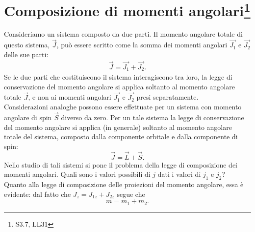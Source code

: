 \documentclass[a4paper,12pt,oneside]{book}
\newcommand*{\myfont}{\fontfamily{ppl}\selectfont}
\begin{document}
\fancypagestyle{plain}{%
\fancyhf{} %
\fancyfoot[C]{\bfseries \myfont{\thepage}} %
\renewcommand{\headrulewidth}{0pt}
\renewcommand{\footrulewidth}{0pt}}

\fancypagestyle{VS}{
\headheight = 15pt
\lhead[\myfont{\textit{\textbf{\thechapter\nouppercase{\leftmark}}}}]{\myfont{\textit{\textbf{\nouppercase{\leftmark}}}}}
\chead[]{}
\rhead[\myfont{\textbf{\thepage}}]{\myfont{\textbf{\thepage}}}

\lfoot[]{}
\cfoot[]{}
\rfoot[]{}
}



\pagestyle{VS}
\setcounter{chapter}{18}
\setcounter{page}{190}
\chapter[Composizione di momenti angolari]{Composizione di momenti angolari\footnote{S3.7, LL31}}
Consideriamo un sistema composto da due parti. Il momento angolare totale di questo sistema, $\vec{J}$, può essere scritto come la somma dei momenti angolari $\vec{J_1}$ e $\vec{J_2}$ delle sue parti:
\begin{align} \label{eq:cap19_01}
\vec{J} = \vec{J_1} + \vec{J_2}.
\end{align}
Se le due parti che costituiscono il sistema interagiscono tra loro, la legge di conservazione del momento angolare si applica soltanto al momento angolare totale $\vec{J}$, e non ai momenti angolari $\vec{J_1}$ e $\vec{J_2}$ presi separatamente.\\
Considerazioni analoghe possono essere effettuate per un sistema con momento angolare di spin $\vec{S}$ diverso da zero. Per un tale sistema la legge di conservazione del momento angolare si applica (in generale) soltanto al momento angolare totale del sistema, composto dalla componente orbitale e dalla componente di spin:
\begin{equation}
\vec{J} = \vec{L} + \vec{S}.
\end{equation}
Nello studio di tali sistemi si pone il problema della legge di composizione dei momenti angolari. Quali sono i valori possibili di $j$ dati i valori di $j_1$ e $j_2$? \\
Quanto alla legge di composizione delle proiezioni del momento angolare, essa è evidente: dal fatto che $J_z = J_{1z} + J_{2z}$ segue che 
\begin{equation} \label{eq:cap19_02}
m= m_1 + m_2.
\end{equation}
\end{document}
